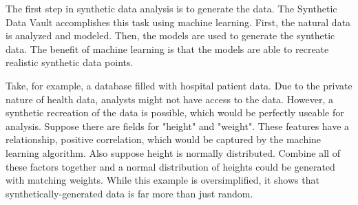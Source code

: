 The first step in synthetic data analysis is to generate the data. The Synthetic Data Vault accomplishes this task using machine learning. First, the natural data is analyzed and modeled. Then, the models are used to generate the synthetic data. The benefit of machine learning is that the models are able to recreate realistic synthetic data points.

Take, for example, a database filled with hospital patient data. Due to the private nature of health data, analysts might not have access to the data. However, a synthetic recreation of the data is possible, which would be perfectly useable for analysis. Suppose there are fields for "height" and "weight". These features have a relationship, positive correlation, which would be captured by the machine learning algorithm.\cite{} Also suppose height is normally distributed. Combine all of these factors together and a normal distribution of heights could be generated with matching weights. While this example is oversimplified, it shows that synthetically-generated data is far more than just random.


 

